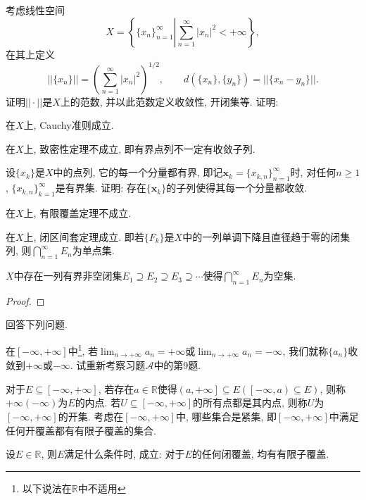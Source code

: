 \begin{quizb}
\woe 考虑线性空间\[X=\left\lbrace \{x_n\}_{n=1}^{\infty}\left| \sum_{n=1}^{\infty}|x_n|^2<+\infty\right. \right\rbrace ,\]在其上定义\[||\{x_n\}||=\left(\sum_{n=1}^{\infty}|x_n|^2\right)^{1/2},\qquad d\left(\{x_n\},\{y_n\}\right)=||\{x_n-y_n\}||.\]证明\(||\cdot||\)是\(X\)上的范数, 并以此范数定义收敛性, 开闭集等. 证明: 
\begin{quizs}
\item 在\(X\)上, Cauchy准则成立.
\item 在\(X\)上, 致密性定理不成立, 即有界点列不一定有收敛子列.
\item 设\(\{x_k\}\)是\(X\)中的点列, 它的每一个分量都有界, 即记\(\boldsymbol{x}_k=\{x_{k,n}\}_{n=1}^{\infty}\)时, 对任何\(n\geqslant 1\), \(\{x_{k,n}\}_{k=1}^{\infty}\)是有界集. 证明: 存在\(\{\boldsymbol{x}_k\}\)的子列使得其每一个分量都收敛.
\item 在\(X\)上, 有限覆盖定理不成立.
\item 在\(X\)上, 闭区间套定理成立. 即若\(\{F_k\}\)是\(X\)中的一列单调下降且直径趋于零的闭集列, 则\( \bigcap_{n=1}^{\infty}E_n\)为单点集.
\item \(X\)中存在一列有界非空闭集\(E_1\supseteq E_2\supseteq E_3\supseteq \cdots\)使得\(\bigcap_{n=1}^{\infty}E_n\)为空集.
\end{quizs}
\begin{proof}

\end{proof}
\woe 回答下列问题.
\begin{quizs}
    \item 在\([-\infty,+\infty]\)中\footnote{以下说法在\(\mathbb{R}\)中不适用}, 若\(\lim_{n\rightarrow+\infty}a_n=+\infty\)或\(\lim_{n\rightarrow+\infty}a_n=-\infty\), 我们就称\(\{a_n\}\)收敛到\(+\infty\)或\(-\infty\). 试重新考察习题\(\boldsymbol{\mathcal{A}}\)中的第9题.
    \item 对于\(E\subseteq[-\infty,+\infty] \), 若存在\(a\in \mathbb{R}\)使得\(\left(a,+\infty\right]\subseteq E\left(\left[-\infty,a\right)\subseteq E\right)\), 则称\(+\infty(-\infty)\)为\(E\)的内点. 若\(U\subseteq[-\infty,+\infty]\)的所有点都是其内点, 则称\(U\)为\([-\infty,+\infty]\)的开集. 考虑在\([-\infty,+\infty]\)中, 哪些集合是紧集, 即\([-\infty,+\infty]\)中满足任何开覆盖都有有限子覆盖的集合.
\end{quizs}
\woe 设\(E\in\mathbb{R}\), 则\(E\)满足什么条件时, 成立: 对于\(E\)的任何闭覆盖, 均有有限子覆盖.
\begin{solution}
	

\end{solution}
\end{quizb}

